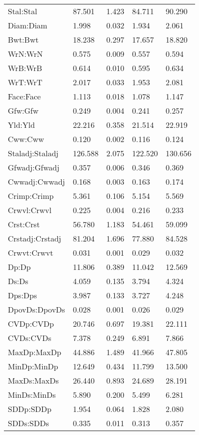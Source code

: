 \begin{center}
\begin{longtable}{|p{1.5in}|p{0.8in}|p{0.8in}|p{0.8in}|p{0.8in}|}
 Stal:Stal & 87.501 & 1.423 & 84.711 & 90.290 \\ 
 Diam:Diam & 1.998 & 0.032 & 1.934 & 2.061 \\ 
 Bwt:Bwt & 18.238 & 0.297 & 17.657 & 18.820 \\ 
 WrN:WrN & 0.575 & 0.009 & 0.557 & 0.594 \\ 
 WrB:WrB & 0.614 & 0.010 & 0.595 & 0.634 \\ 
 WrT:WrT & 2.017 & 0.033 & 1.953 & 2.081 \\ 
 Face:Face & 1.113 & 0.018 & 1.078 & 1.147 \\ 
 Gfw:Gfw & 0.249 & 0.004 & 0.241 & 0.257 \\ 
 Yld:Yld & 22.216 & 0.358 & 21.514 & 22.919 \\ 
 Cww:Cww & 0.120 & 0.002 & 0.116 & 0.124 \\ 
 Staladj:Staladj & 126.588 & 2.075 & 122.520 & 130.656 \\ 
 Gfwadj:Gfwadj & 0.357 & 0.006 & 0.346 & 0.369 \\ 
 Cwwadj:Cwwadj & 0.168 & 0.003 & 0.163 & 0.174 \\ 
 Crimp:Crimp & 5.361 & 0.106 & 5.154 & 5.569 \\ 
 Crwvl:Crwvl & 0.225 & 0.004 & 0.216 & 0.233 \\ 
 Crst:Crst & 56.780 & 1.183 & 54.461 & 59.099 \\ 
 Crstadj:Crstadj & 81.204 & 1.696 & 77.880 & 84.528 \\ 
 Crwvt:Crwvt & 0.031 & 0.001 & 0.029 & 0.032 \\ 
 Dp:Dp & 11.806 & 0.389 & 11.042 & 12.569 \\ 
 Ds:Ds & 4.059 & 0.135 & 3.794 & 4.324 \\ 
 Dps:Dps & 3.987 & 0.133 & 3.727 & 4.248 \\ 
 DpovDs:DpovDs & 0.028 & 0.001 & 0.026 & 0.029 \\ 
 CVDp:CVDp & 20.746 & 0.697 & 19.381 & 22.111 \\ 
 CVDs:CVDs & 7.378 & 0.249 & 6.891 & 7.866 \\ 
 MaxDp:MaxDp & 44.886 & 1.489 & 41.966 & 47.805 \\ 
 MinDp:MinDp & 12.649 & 0.434 & 11.799 & 13.500 \\ 
 MaxDs:MaxDs & 26.440 & 0.893 & 24.689 & 28.191 \\ 
 MinDs:MinDs & 5.890 & 0.200 & 5.499 & 6.281 \\ 
 SDDp:SDDp & 1.954 & 0.064 & 1.828 & 2.080 \\ 
 SDDs:SDDs & 0.335 & 0.011 & 0.313 & 0.357 \\ 

\end{longtable}
\end{center}

